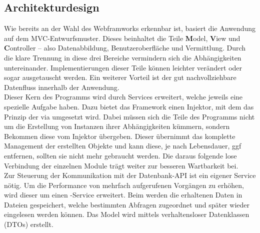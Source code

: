 \subsection{Architekturdesign}
\label{sec:Architekturdesign}
Wie bereits an der Wahl des Webframworks erkennbar ist, basiert die Anwendung auf dem \acs{MVC}-Entwurfsmuster.
Dieses beinhaltet die Teile \textbf{M}odel, \textbf{V}iew und \textbf{C}ontroller -- also Datenabbildung, 
Benutzeroberfläche und Vermittlung. Durch die klare Trennung in diese drei Bereiche vermindern sich
die Abhängigkeiten untereinander. Implementierungen dieser Teile können leichter verändert oder sogar ausgetauscht werden.
Ein weiterer Vorteil ist der gut nachvollziehbare Datenfluss innerhalb der Anwendung.\\
Dieser Kern des Programms wird durch Services erweitert, welche jeweils eine spezielle Aufgabe haben.
Dazu bietet das Framework einen Injektor, mit dem das Prinzip der  via 
 umgesetzt wird. Dabei müssen sich die Teile des Programms nicht um die Erstellung von
Instanzen ihrer Abhängigkeiten kümmern, sondern Bekommen diese vom Injektor übergeben. Dieser übernimmt
das komplette Management der erstellten Objekte und kann diese, je nach Lebensdauer, \acs{ggf} entfernen, sollten sie nicht mehr 
gebraucht werden. Die daraus folgende lose Verbindung der einzelnen Module trägt weiter zur besseren Wartbarkeit bei.\\
Zur Steuerung der Kommunikation mit der Datenbank-API ist ein eigener Service nötig. Um die Performance von
mehrfach aufgerufenen Vorgängen zu erhöhen, wird dieser um einen -Service erweitert.
Beim  werden die erhaltenen Daten in Dateien gespeichert, welche bestimmten Abfragen
zugeordnet und später wieder eingelesen werden können.
Das Model wird mittels verhaltensloser Datenklassen (\acs{DTO}s) erstellt. 


